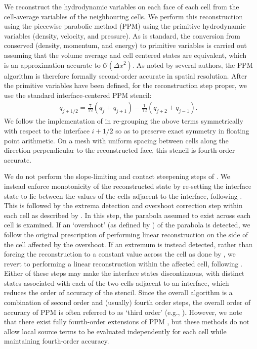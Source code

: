 \documentclass[fleqn,usenatbib]{mnras}
\begin{document}
We reconstruct the hydrodynamic variables on each face of each cell from the cell-average variables of the neighbouring cells. We perform this reconstruction using the piecewise parabolic method (PPM) \citep[hereafter ]{Colella_1984} using the primitive hydrodynamic variables (density, velocity, and pressure). As is standard, the conversion from conserved (density, momentum, and energy) to primitive variables is carried out assuming that the volume average and cell centered states are equivalent, which is an approximation accurate to $\mathcal{O}(\Delta x^2)$. As noted by several authors, the PPM algorithm is therefore formally second-order accurate in spatial resolution. After the primitive variables have been defined, for the reconstruction step proper, we use the standard interface-centered PPM stencil:
\begin{align}
q_{j+1/2} = \frac{7}{12} (q_j + q_{j+1}) - \frac{1}{12} (q_{j+2} + q_{j-1}).
\end{align}
We follow the implementation of \cite{Stone_2020} in re-grouping the above terms symmetrically with respect to the interface ${i+{1/2}}$ so as to preserve exact symmetry in floating point arithmetic. On a mesh with uniform spacing between cells along the direction perpendicular to the reconstructed face, this stencil is fourth-order accurate.

We do not perform the slope-limiting and contact steepening steps of . We instead enforce monotonicity of the reconstructed state by re-setting the interface state to lie between the values of the cells adjacent to the interface, following \cite{Mignone_2005}. This is followed by the extrema detection and overshoot correction step within each cell as described by . In this step, the parabola assumed to exist across each cell is examined. If an `overshoot' (as defined by ) of the parabola is detected, we follow the original  prescription of performing linear reconstruction on the side of the cell affected by the overshoot. If an extremum is instead detected, rather than forcing the reconstruction to a constant value across the cell as done by , we revert to performing a linear reconstruction within the affected cell, following \cite{Balsara_2017}. Either of these steps may make the interface states discontinuous, with distinct states associated with each of the two cells adjacent to an interface, which reduces the order of accuracy of the stencil. Since the overall algorithm is a combination of second order and (usually) fourth order steps, the overall order of accuracy of PPM is often referred to as `third order' (e.g., \citealt{Stone_2020}). However, we note that there exist fully fourth-order extensions of PPM \citep{Felker_2018}, but these methods do not allow local source terms to be evaluated independently for each cell while maintaining fourth-order accuracy.
\end{document}
